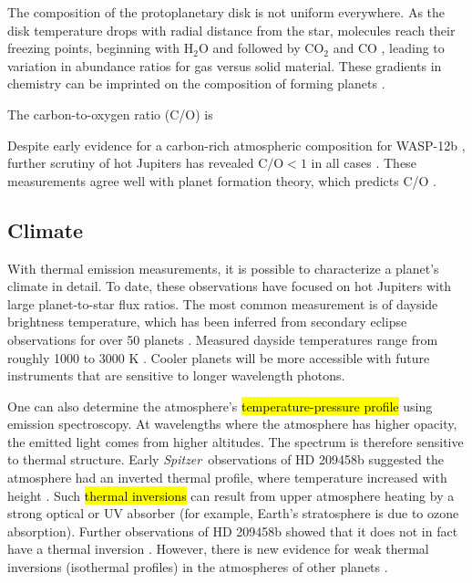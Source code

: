 \documentclass[graybox,natbib,nosecnum]{svmult}
\newcommand{\hbindex}[1]{\hl{#1}\index{#1}}  %
\newcommand{\project}[1]{\textsl{#1}}
\newcommand{\Spitzer}{\project{Spitzer}}
\begin{document}
The composition of the protoplanetary disk is not uniform everywhere. As the disk temperature drops with radial distance from the star, molecules reach their freezing points, beginning with H$_2$O and followed by CO$_2$ and CO \citep{oberg11}, leading to variation in abundance ratios for gas versus solid material. These gradients in chemistry can be imprinted on the composition of forming planets \citep{madhusudhan14, alidib16, mordasini16}.

The carbon-to-oxygen ratio (C/O) is 

Despite early evidence for a carbon-rich atmospheric composition for WASP-12b \citep{madhusudhan11}, further scrutiny of hot Jupiters has revealed $\mathrm{C/O} < 1$ in all cases \citep{line14, kreidberg15b, benneke15, barstow17}.  These measurements agree well with planet formation theory, which predicts C/O  \citep[e.g.][]{madhusudhan14, mordasini16}. 

\subsection{Climate}
With thermal emission measurements, it is possible to characterize a planet's climate in detail.  To date, these observations have focused on hot Jupiters with large planet-to-star flux ratios. The most common measurement is of dayside brightness temperature, which has been inferred from secondary eclipse observations for over 50 planets \citep{schwartz15}. Measured dayside temperatures range from roughly 1000 to 3000 K \citep{stevenson14b, kammer15, morley17}.  Cooler planets will be more accessible with future instruments that are sensitive to longer wavelength photons.

One can also determine the atmosphere's \hbindex{temperature-pressure profile} using emission spectroscopy. At wavelengths where the atmosphere has higher opacity, the emitted light comes from higher altitudes. The spectrum is therefore sensitive to thermal structure.  Early \Spitzer\ observations of HD 209458b suggested the atmosphere had an inverted thermal profile, where temperature increased with height \citep{knutson08}. Such \hbindex{thermal inversions} can result from upper atmosphere heating by a strong optical or UV absorber (for example, Earth's stratosphere is due to ozone absorption).  Further observations of HD 209458b showed that it does not in fact have a thermal inversion \citep{diamond-lowe14, schwarz15}. However, there is new evidence for weak thermal inversions (isothermal profiles) in the atmospheres of other planets \citep{stevenson14, haynes15}.
 
\end{document}
